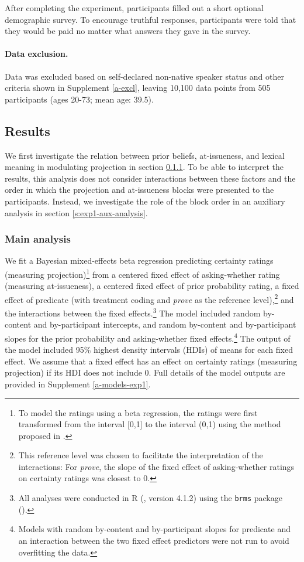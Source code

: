 \documentclass[11pt,fleqn]{article}
\newcommand{\6}{\mbox{$[\hspace*{-.6mm}[$}}
\newcommand{\9}{\mbox{$]\hspace*{-.6mm}]$}}
\begin{document}
After completing the experiment, participants filled out a short optional demographic survey. To encourage truthful responses, participants were told that they would be paid no matter what answers they gave in the survey.

\paragraph{Data exclusion.} Data was excluded based on self-declared non-native speaker status and other criteria shown in Supplement \ref{a-excl}, leaving 10,100 data points from 505 participants (ages 20-73; mean age: 39.5).

\subsection{Results}\label{s-results-exp1}

We first investigate the relation between prior beliefs, at-issueness, and lexical meaning in modulating projection in section \ref{s:exp1-main-analysis}. To be able to interpret the results, this analysis does not consider interactions between these factors and the order in which the projection and at-issueness blocks were presented to the participants. Instead, we investigate the role of the block order in an auxiliary analysis in section \ref{s:exp1-aux-analysis}.

\subsubsection{Main analysis}\label{s:exp1-main-analysis}

We fit a Bayesian mixed-effects beta regression predicting certainty ratings (measuring projection)\footnote{\label{fn:transform}To model the ratings using a beta regression, the ratings were first transformed from the interval [0,1] to the interval (0,1) using the method proposed in \citealt{smithson-verkuilen2006}.} from a centered fixed effect of asking-whether rating (measuring at-issueness), a centered fixed effect of prior probability rating, a fixed effect of predicate (with treatment coding and {\em prove} as the reference level),\footnote{This reference level was chosen to facilitate the interpretation of the interactions: For {\em prove}, the slope of the fixed effect of asking-whether ratings on certainty ratings was closest to 0.} and the interactions between the fixed effects.\footnote{All analyses were conducted in R (\citealt{R}, version 4.1.2) using the {\tt brms} package (\citealt{buerkner2017}).} The model included random by-content and by-participant intercepts, and random by-content and by-participant slopes for the prior probability and asking-whether fixed effects.\footnote{Models with random by-content and by-participant slopes for predicate and an interaction between the two fixed effect predictors were not run to avoid overfitting the data.} The output of the model included 95\% highest density intervals (HDIs) of means for each fixed effect. We assume that a fixed effect has an effect on certainty ratings (measuring projection) if its HDI does not include 0. Full details of the model outputs are provided in Supplement \ref{a-models-exp1}. 
\end{document}
